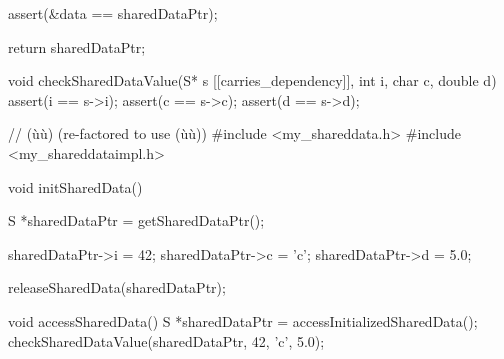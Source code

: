 \begin{emcppslisting}
{    assert(&data == sharedDataPtr);                                             
                                                                                
    return sharedDataPtr;                                                       
}  

void checkSharedDataValue(S*     s [[carries_dependency]],                      
                          int    i,                                             
                          char   c,                                             
                          double d)                                             
{                                                                               
    assert(i == s->i);                                                          
    assert(c == s->c);                                                          
    assert(d == s->d);                                                          
}    
\end{emcppslisting}
\newpage%
\begin{emcppslisting}
// (ù{}ù) (re-factored to use (ù{}ù))                              
#include <my_shareddata.h>                                                      
#include <my_shareddataimpl.h>                                                  
                                                                                
void initSharedData()                                                           
{                                                                               
    S *sharedDataPtr = getSharedDataPtr();                                      
                                                                                
    sharedDataPtr->i = 42;                                                      
    sharedDataPtr->c = 'c';                                                     
    sharedDataPtr->d = 5.0;                                                     
                                                                                
    releaseSharedData(sharedDataPtr);                                           
}                                                                               
                                                                                
void accessSharedData()                                                         
{                                                                               
    S *sharedDataPtr = accessInitializedSharedData();                           
    checkSharedDataValue(sharedDataPtr, 42, 'c', 5.0);                          
}       
\end{emcppslisting}

